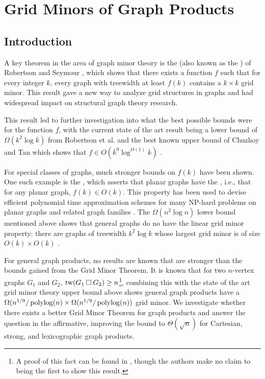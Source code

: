 \documentclass[../main.tex]{subfiles}
\begin{document}
	\section{Grid Minors of Graph Products}\label{P2}
	\subsection{Introduction}
	A key theorem in the area of graph minor theory is the  (also known as the ) of Robertson and Seymour \cite{RS-V}, which shows that there exists a function $f$ such that for every integer $k$, every graph with treewidth at least $f(k)$ contains a $k \times k$ grid minor. This result gave a new way to analyze grid structures in graphs and had widespread impact on structural graph theory research.
	
	This result led to further investigation into what the best possible bounds were for the function $f$, with the current state of the art result being a lower bound of $\Omega(k^2\log k)$ from Robertson et al. \cite{RST-JCTB94} and the best known upper bound of Chuzhoy and Tan which shows that $f \in O(k^9\log^{O(1)}k)$ \cite{CT21}.
	
	For special classes of graphs, much stronger bounds on $f(k)$ have been shown. One such example is the , which asserts that planar graphs have the , i.e., that for any planar graph, $f(k) \in O(k)$.  This property has been used to devise efficient polynomial time approximation schemes for many NP-hard problems on planar graphs and related graph families \cite{DHK-Algo09,DFHT-JACM05,DH-Algo04, Eppstein-Algo00, FFLS18}. The $\Omega(n^2\log n)$ lower bound mentioned above shows that general graphs do no have the linear grid minor property: there are graphs of treewidth $k^2\log k$ whose largest grid minor is of size $O(k)\times O(k)$ \cite{RST-JCTB94}.
	
	For general graph products, no results are known that are stronger than the bounds gained from the Grid Minor Theorem. It is known that for two $n$-vertex graphs $G_1$ and $G_2$, $\operatorname{tw}(G_1 \mathbin{\Box} G_2) \ge n$\footnote{A proof of this fact can be found in \cite{DMWW24}, though the authors make no claim to being the first to show this result.}, combining this with the state of the art grid minor theory upper bound above shows general graph products have a $\Omega(n^{1/9}/\operatorname{polylog}(n) \times \Omega(n^{1/9}/\operatorname{polylog}(n))$ grid minor. We investigate whether there exists a better Grid Minor Theorem for graph products and answer the question in the affirmative, improving the bound to $\Theta(\sqrt{n})$ for Cartesian, strong, and lexicographic graph products.
	
\end{document}

